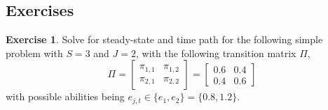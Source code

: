 \documentclass[letterpaper,12pt]{article}
\theoremstyle{definition}
\newtheorem{exercise}{Exercise} %
\numberwithin{equation}{section}
\numberwithin{exercise}{section}
\begin{document}
\begin{spacing}{1.5}


   \subsection{Exercises}\label{SecSperStochEx}

      \renewcommand\theenumi{\alph{enumi}}
      \begin{exercise}\label{ExSperStochPi2}
         Solve for steady-state and time path for the following simple problem with $S=3$ and $J=2$, with the following transition matrix $\Pi$,
         \begin{equation*}
            \Pi = \begin{bmatrix}
                     \pi_{1,1} & \pi_{1,2} \\
                     \pi_{2,1} & \pi_{2,2}
                  \end{bmatrix} =
                  \begin{bmatrix}
                     0.6 & 0.4 \\
                     0.4 & 0.6
                  \end{bmatrix}
         \end{equation*}
         with possible abilities being $e_{j,t}\in\{e_1,e_2\}=\{0.8,1.2\}$.
      \end{exercise}


\end{spacing}
\end{document}

